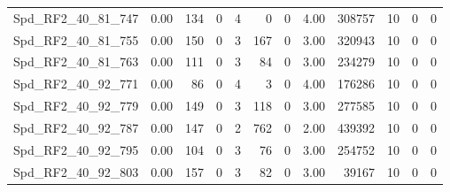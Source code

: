 \begin{longtable}[c]{@{}lrrrrrrrrrrr@{}}
Spd\_RF2\_40\_81\_747        & 0.00                   & 134                     & 0                       & 4                      & 0                       & 0                       & 4.00                    & 308757                   & 10                       & 0                        & 0                        \\
Spd\_RF2\_40\_81\_755        & 0.00                   & 150                     & 0                       & 3                      & 167                     & 0                       & 3.00                    & 320943                   & 10                       & 0                        & 0                        \\
Spd\_RF2\_40\_81\_763        & 0.00                   & 111                     & 0                       & 3                      & 84                      & 0                       & 3.00                    & 234279                   & 10                       & 0                        & 0                        \\
Spd\_RF2\_40\_92\_771        & 0.00                   & 86                      & 0                       & 4                      & 3                       & 0                       & 4.00                    & 176286                   & 10                       & 0                        & 0                        \\
Spd\_RF2\_40\_92\_779        & 0.00                   & 149                     & 0                       & 3                      & 118                     & 0                       & 3.00                    & 277585                   & 10                       & 0                        & 0                        \\
Spd\_RF2\_40\_92\_787        & 0.00                   & 147                     & 0                       & 2                      & 762                     & 0                       & 2.00                    & 439392                   & 10                       & 0                        & 0                        \\
Spd\_RF2\_40\_92\_795        & 0.00                   & 104                     & 0                       & 3                      & 76                      & 0                       & 3.00                    & 254752                   & 10                       & 0                        & 0                        \\
Spd\_RF2\_40\_92\_803        & 0.00                   & 157                     & 0                       & 3                      & 82                      & 0                       & 3.00                    & 39167                    & 10                       & 0                        & 0                        \\

\end{longtable}
